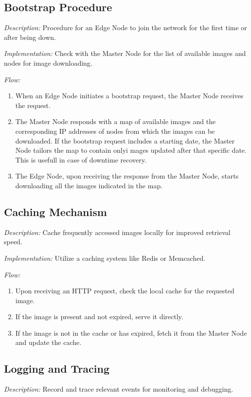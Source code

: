 \documentclass{article}
\begin{document}
  \subsection{Bootstrap Procedure}
  \textit{Description:} Procedure for an Edge Node to join the network for the first time or after being down.

  \textit{Implementation:} Check with the Master Node for the list of available images and nodes for image downloading.

  \textit{Flow:}
  \begin{enumerate}[label=\arabic*.]
    \item When an Edge Node initiates a bootstrap request, the Master Node receives the request.
    \item The Master Node responds with a map of available images and the corresponding IP addresses of nodes
    from which the images can be downloaded. If the bootstrap request includes a starting date, the Master Node tailors
    the map to contain onlyi mages updated after that specific date. This is usefull in case of downtime recovery.
    \item The Edge Node, upon receiving the response from the Master Node, starts downloading all the images
    indicated in the map.
  \end{enumerate}


  \subsection{Caching Mechanism}
  \textit{Description:} Cache frequently accessed images locally for improved retrieval speed.

  \textit{Implementation:} Utilize a caching system like Redis or Memcached.

  \textit{Flow:}
  \begin{enumerate}[label=\arabic*.]
    \item Upon receiving an HTTP request, check the local cache for the requested image.
    \item If the image is present and not expired, serve it directly.
    \item If the image is not in the cache or has expired, fetch it from the Master Node and update the cache.
  \end{enumerate}


  \subsection{Logging and Tracing}
  \textit{Description:} Record and trace relevant events for monitoring and debugging.
\end{document}
